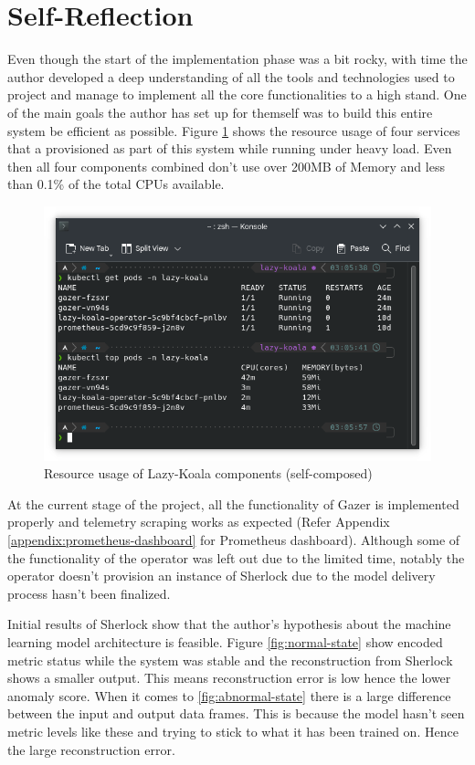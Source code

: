 \section{Self-Reflection}

Even though the start of the implementation phase was a bit rocky, with time the author developed a deep understanding of all the tools and technologies used to project and manage to implement all the core functionalities to a high stand. One of the main goals the author has set up for themself was to build this entire system be efficient as possible. Figure \ref{fig:service-benchmark} shows the resource usage of four services that a provisioned as part of this system while running under heavy load. Even then all four components combined don't use over 200MB of Memory and less than 0.1\% of the total CPUs available.

\begin{figure}[H]
    \includegraphics[width=15cm]{assets/implementation/service-benchmark.png}
    \caption{Resource usage of Lazy-Koala components (self-composed)}
    \label{fig:service-benchmark}
\end{figure}

At the current stage of the project, all the functionality of Gazer is implemented properly and telemetry scraping works as expected (Refer Appendix \ref{appendix:prometheus-dashboard} for Prometheus dashboard). Although some of the functionality of the operator was left out due to the limited time, notably the operator doesn't provision an instance of Sherlock due to the model delivery process hasn't been finalized.

Initial results of Sherlock show that the author's hypothesis about the machine learning model architecture is feasible. Figure \ref{fig:normal-state} show encoded metric status while the system was stable and the reconstruction from Sherlock shows a smaller output. This means reconstruction error is low hence the lower anomaly score. When it comes to \ref{fig:abnormal-state} there is a large difference between the input and output data frames. This is because the model hasn't seen metric levels like these and trying to stick to what it has been trained on. Hence the large reconstruction error.

